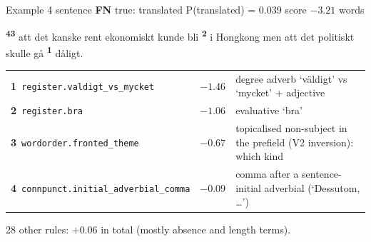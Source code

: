 \begin{exbox}[unbreakable]{Example 4 \quad sentence \quad \textbf{FN} \quad true: translated \quad P(translated) = 0.039 \quad score $-3.21$  words}
{\setlength{\parindent}{0pt}\raggedright {}\textsuperscript{\sffamily\bfseries 4}\textsuperscript{\sffamily\bfseries 3} att det kanske rent ekonomiskt kunde bli \textsuperscript{\sffamily\bfseries 2} i Hongkong men att det politiskt skulle gå \textsuperscript{\sffamily\bfseries 1} dåligt.}\par{}
\par\medskip
{\footnotesize
\begin{tabularx}{\linewidth}{@{}l r X@{}}
\textbf{1}~\texttt{register.valdigt\_vs\_mycket} & $-1.46$ & degree adverb `väldigt' vs `mycket' + adjective \\
\textbf{2}~\texttt{register.bra} & $-1.06$ & evaluative `bra' \\
\textbf{3}~\texttt{wordorder.fronted\_theme} & $-0.67$ & topicalised non-subject in the prefield (V2 inversion): which kind \\
\textbf{4}~\texttt{connpunct.initial\_adverbial\_comma} & $-0.09$ & comma after a sentence-initial adverbial (`Dessutom, \ldots{}') \\
\end{tabularx}
\par 28 other rules: $+0.06$ in total (mostly absence and length terms).}
\par{}
\end{exbox}


